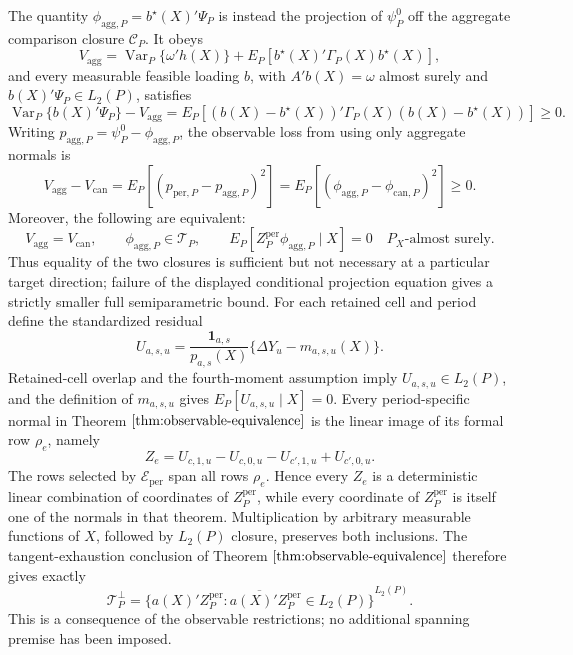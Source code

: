 The quantity \(\phi_{\mathrm{agg},P}=b^\star(X)'\Psi_P\) is instead the projection of \(\psi_P^0\) off the aggregate comparison closure \(\mathcal C_P\).  It obeys
\[
V_{\mathrm{agg}}
=\operatorname{Var}_P\{\omega'h(X)\}
+E_P[b^\star(X)'\Gamma_P(X)b^\star(X)],
\]
and every measurable feasible loading \(b\), with \(A'b(X)=\omega\) almost surely and \(b(X)'\Psi_P\in L_2(P)\), satisfies
\[
\operatorname{Var}_P\{b(X)'\Psi_P\}-V_{\mathrm{agg}}
=E_P[(b(X)-b^\star(X))'\Gamma_P(X)(b(X)-b^\star(X))]\geq0.
\]
Writing \(p_{\mathrm{agg},P}=\psi_P^0-\phi_{\mathrm{agg},P}\), the observable loss from using only aggregate normals is
\[
V_{\mathrm{agg}}-V_{\mathrm{can}}
=E_P[(p_{\mathrm{per},P}-p_{\mathrm{agg},P})^2]
=E_P[(\phi_{\mathrm{agg},P}-\phi_{\mathrm{can},P})^2]\geq0.
\]
Moreover, the following are equivalent:
\[
V_{\mathrm{agg}}=V_{\mathrm{can}},\qquad
\phi_{\mathrm{agg},P}\in\mathcal T_P,
\qquad
E_P[Z_P^{\mathrm{per}}\phi_{\mathrm{agg},P}\mid X]=0
\quad P_X\text{-almost surely}.
\]
Thus equality of the two closures is sufficient but not necessary at a particular target direction; failure of the displayed conditional projection equation gives a strictly smaller full semiparametric bound.
For each retained cell and period define the standardized residual
\[
U_{a,s,u}=\frac{\mathbf 1_{a,s}}{p_{a,s}(X)}\{\Delta Y_u-m_{a,s,u}(X)\}.
\]
Retained-cell overlap and the fourth-moment assumption imply \(U_{a,s,u}\in L_2(P)\), and the definition of \(m_{a,s,u}\) gives \(E_P[U_{a,s,u}\mid X]=0\).  Every period-specific normal in Theorem \(\ref{thm:observable-equivalence}\) is the linear image of its formal row \(\rho_e\), namely
\[
Z_e=U_{c,1,u}-U_{c,0,u}-U_{c',1,u}+U_{c',0,u}.
\]
The rows selected by \(\mathcal E_{\mathrm{per}}\) span all rows \(\rho_e\).  Hence every \(Z_e\) is a deterministic linear combination of coordinates of \(Z_P^{\mathrm{per}}\), while every coordinate of \(Z_P^{\mathrm{per}}\) is itself one of the normals in that theorem.  Multiplication by arbitrary measurable functions of \(X\), followed by \(L_2(P)\) closure, preserves both inclusions.  The tangent-exhaustion conclusion of Theorem \(\ref{thm:observable-equivalence}\) therefore gives exactly
\[
\mathcal T_P^\perp
=\overline{\{a(X)'Z_P^{\mathrm{per}}:a(X)'Z_P^{\mathrm{per}}\in L_2(P)\}}^{L_2(P)}.
\tag{1}
\]
This is a consequence of the observable restrictions; no additional spanning premise has been imposed.

